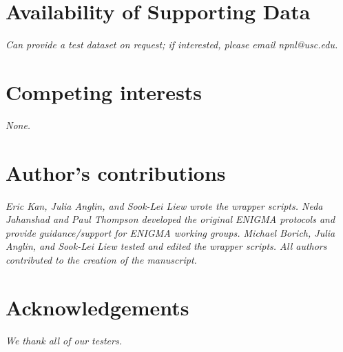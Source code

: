 \documentclass[twocolumn]{bmcart}%
\begin{document}

\begin{backmatter}

\section*{Availability of Supporting Data}
\emph{Can provide a test dataset on request; if interested, please email npnl@usc.edu.} 

\section*{Competing interests}
\emph{None.}

\section*{Author's contributions}
\emph{Eric Kan, Julia Anglin, and Sook-Lei Liew wrote the wrapper scripts. Neda Jahanshad and Paul Thompson developed the original ENIGMA protocols and provide guidance/support for ENIGMA working groups. Michael Borich, Julia Anglin, and Sook-Lei Liew tested and edited the wrapper scripts. All authors contributed to the creation of the manuscript.}

\section*{Acknowledgements}
\emph{We thank all of our testers.}

  
  


\end{backmatter}
\end{document}
